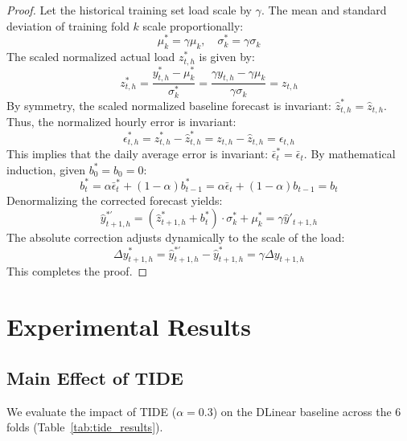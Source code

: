 \documentclass[11pt,letterpaper]{article}
\begin{document}
\begin{proof}
Let the historical training set load scale by $\gamma$. The mean and standard deviation of training fold $k$ scale proportionally:
\begin{equation}
\mu_k^* = \gamma \mu_k, \quad \sigma_k^* = \gamma \sigma_k
\end{equation}
The scaled normalized actual load $z^*_{t,h}$ is given by:
\begin{equation}
z^*_{t,h} = \frac{y^*_{t,h} - \mu_k^*}{\sigma_k^*} = \frac{\gamma y_{t,h} - \gamma \mu_k}{\gamma \sigma_k} = z_{t,h}
\end{equation}
By symmetry, the scaled normalized baseline forecast is invariant: $\hat{z}^*_{t,h} = \hat{z}_{t,h}$. 
Thus, the normalized hourly error is invariant:
\begin{equation}
\epsilon^*_{t,h} = z^*_{t,h} - \hat{z}^*_{t,h} = z_{t,h} - \hat{z}_{t,h} = \epsilon_{t,h}
\end{equation}
This implies that the daily average error is invariant: $\bar{\epsilon}^*_t = \bar{\epsilon}_t$. By mathematical induction, given $b_0^* = b_0 = 0$:
\begin{equation}
b^*_t = \alpha \bar{\epsilon}^*_t + (1 - \alpha) b^*_{t-1} = \alpha \bar{\epsilon}_t + (1 - \alpha) b_{t-1} = b_t
\end{equation}
Denormalizing the corrected forecast yields:
\begin{equation}
\hat{y}^{*'}_{t+1,h} = (\hat{z}^*_{t+1,h} + b^*_t) \cdot \sigma_k^* + \mu_k^* = \gamma \hat{y}'_{t+1,h}
\end{equation}
The absolute correction adjusts dynamically to the scale of the load:
\begin{equation}
\Delta y^*_{t+1,h} = \hat{y}^{*'}_{t+1,h} - \hat{y}^*_{t+1,h} = \gamma \Delta y_{t+1,h}
\end{equation}
This completes the proof.
\end{proof}

\section{Experimental Results}
\label{sec:experiments}

\subsection{Main Effect of TIDE}
We evaluate the impact of TIDE ($\alpha = 0.3$) on the DLinear baseline across the 6 folds (Table~\ref{tab:tide_results}).
\end{document}
